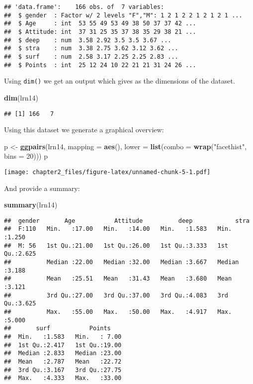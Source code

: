 \documentclass[]{article}
\newenvironment{Shaded}{\begin{snugshade}}{\end{snugshade}}
\newcommand{\KeywordTok}[1]{\textcolor[rgb]{0.13,0.29,0.53}{\textbf{#1}}}
\newcommand{\DataTypeTok}[1]{\textcolor[rgb]{0.13,0.29,0.53}{#1}}
\newcommand{\DecValTok}[1]{\textcolor[rgb]{0.00,0.00,0.81}{#1}}
\newcommand{\StringTok}[1]{\textcolor[rgb]{0.31,0.60,0.02}{#1}}
\newcommand{\NormalTok}[1]{#1}
\begin{document}
\begin{verbatim}
## 'data.frame':    166 obs. of  7 variables:
##  $ gender  : Factor w/ 2 levels "F","M": 1 2 1 2 2 1 2 1 2 1 ...
##  $ Age     : int  53 55 49 53 49 38 50 37 37 42 ...
##  $ Attitude: int  37 31 25 35 37 38 35 29 38 21 ...
##  $ deep    : num  3.58 2.92 3.5 3.5 3.67 ...
##  $ stra    : num  3.38 2.75 3.62 3.12 3.62 ...
##  $ surf    : num  2.58 3.17 2.25 2.25 2.83 ...
##  $ Points  : int  25 12 24 10 22 21 21 31 24 26 ...
\end{verbatim}

Using \texttt{dim()} we get an output which gives as the dimensions of
the dataset.

\begin{Shaded}
\begin{Highlighting}[]
\KeywordTok{dim}\NormalTok{(lrn14)}
\end{Highlighting}
\end{Shaded}

\begin{verbatim}
## [1] 166   7
\end{verbatim}

Using this dataset we generate a graphical overview:

\begin{Shaded}
\begin{Highlighting}[]
\NormalTok{p <-}\StringTok{ }\KeywordTok{ggpairs}\NormalTok{(lrn14, }\DataTypeTok{mapping =} \KeywordTok{aes}\NormalTok{(), }\DataTypeTok{lower =} \KeywordTok{list}\NormalTok{(}\DataTypeTok{combo =} \KeywordTok{wrap}\NormalTok{(}\StringTok{"facethist"}\NormalTok{, }\DataTypeTok{bins =} \DecValTok{20}\NormalTok{)))}
\NormalTok{p}
\end{Highlighting}
\end{Shaded}

\texttt{[image: chapter2\_files/figure-latex/unnamed-chunk-5-1.pdf]}

And provide a summary:

\begin{Shaded}
\begin{Highlighting}[]
\KeywordTok{summary}\NormalTok{(lrn14)}
\end{Highlighting}
\end{Shaded}

\begin{verbatim}
##  gender       Age           Attitude          deep            stra      
##  F:110   Min.   :17.00   Min.   :14.00   Min.   :1.583   Min.   :1.250  
##  M: 56   1st Qu.:21.00   1st Qu.:26.00   1st Qu.:3.333   1st Qu.:2.625  
##          Median :22.00   Median :32.00   Median :3.667   Median :3.188  
##          Mean   :25.51   Mean   :31.43   Mean   :3.680   Mean   :3.121  
##          3rd Qu.:27.00   3rd Qu.:37.00   3rd Qu.:4.083   3rd Qu.:3.625  
##          Max.   :55.00   Max.   :50.00   Max.   :4.917   Max.   :5.000  
##       surf           Points     
##  Min.   :1.583   Min.   : 7.00  
##  1st Qu.:2.417   1st Qu.:19.00  
##  Median :2.833   Median :23.00  
##  Mean   :2.787   Mean   :22.72  
##  3rd Qu.:3.167   3rd Qu.:27.75  
##  Max.   :4.333   Max.   :33.00
\end{verbatim}
\end{document}
